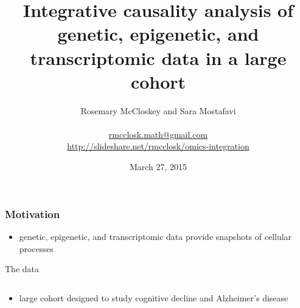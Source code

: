 \documentclass{beamer}
\title[Omics data integration]{Integrative causality analysis of genetic,
epigenetic, and transcriptomic data in a large cohort}
\author[R. McCloskey \& S. Mostafavi]
    {Rosemary McCloskey and Sara Mostafavi \\\hfill\\
     \small
     \url{rmcclosk.math@gmail.com} \\
     \url{http://slideshare.net/rmcclosk/omics-integration}
     \normalsize}
\date{March 27, 2015}
\begin{document}
\maketitle

\begin{frame}
    \frametitle{Motivation}
    \begin{itemize}
        \item genetic, epigenetic, and transcriptomic data provide snapshots of
            cellular processes
    \begin{center}
        \vspace{-0.5cm}
        
    \end{center}
    \end{itemize}
\end{frame}

\begin{frame}{The data}
    \begin{columns}
        \begin{column}{0.35\textwidth}
            \begin{itemize}
                \item large cohort designed to study cognitive decline and
                    Alzheimer's disease
            \end{itemize}
        \end{column}
        \begin{column}{0.7\textwidth}
            
        \end{column}
    \end{columns}
\end{frame}
\end{document}
